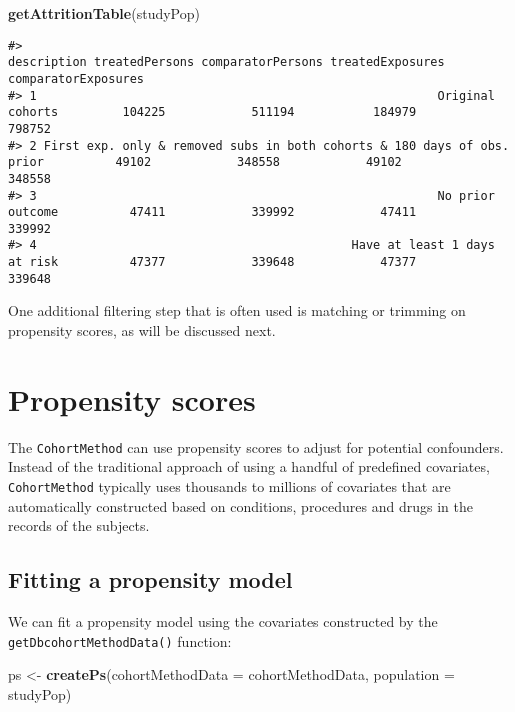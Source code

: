 \documentclass[]{article}
\newenvironment{Shaded}{\begin{snugshade}}{\end{snugshade}}
\newcommand{\DataTypeTok}[1]{\textcolor[rgb]{0.13,0.29,0.53}{#1}}
\newcommand{\KeywordTok}[1]{\textcolor[rgb]{0.13,0.29,0.53}{\textbf{#1}}}
\newcommand{\NormalTok}[1]{#1}
\newcommand{\StringTok}[1]{\textcolor[rgb]{0.31,0.60,0.02}{#1}}
\begin{document}
\begin{Shaded}
\begin{Highlighting}[]
\KeywordTok{getAttritionTable}\NormalTok{(studyPop)}
\end{Highlighting}
\end{Shaded}

\begin{verbatim}
#>                                                               description treatedPersons comparatorPersons treatedExposures comparatorExposures
#> 1                                                        Original cohorts         104225            511194           184979              798752
#> 2 First exp. only & removed subs in both cohorts & 180 days of obs. prior          49102            348558            49102              348558
#> 3                                                        No prior outcome          47411            339992            47411              339992
#> 4                                            Have at least 1 days at risk          47377            339648            47377              339648
\end{verbatim}

One additional filtering step that is often used is matching or trimming
on propensity scores, as will be discussed next.

\hypertarget{propensity-scores}{%
\section{Propensity scores}\label{propensity-scores}}

The \texttt{CohortMethod} can use propensity scores to adjust for
potential confounders. Instead of the traditional approach of using a
handful of predefined covariates, \texttt{CohortMethod} typically uses
thousands to millions of covariates that are automatically constructed
based on conditions, procedures and drugs in the records of the
subjects.

\hypertarget{fitting-a-propensity-model}{%
\subsection{Fitting a propensity
model}\label{fitting-a-propensity-model}}

We can fit a propensity model using the covariates constructed by the
\texttt{getDbcohortMethodData()} function:

\begin{Shaded}
\begin{Highlighting}[]
\NormalTok{ps <-}\StringTok{ }\KeywordTok{createPs}\NormalTok{(}\DataTypeTok{cohortMethodData =}\NormalTok{ cohortMethodData, }\DataTypeTok{population =}\NormalTok{ studyPop)}
\end{Highlighting}
\end{Shaded}
\end{document}
